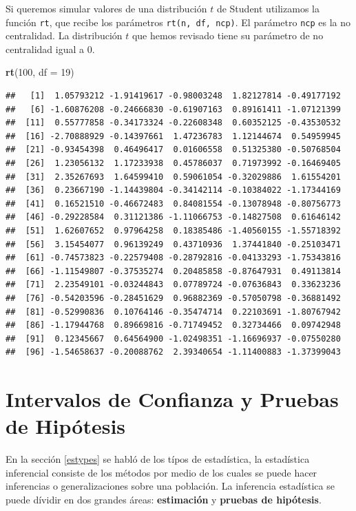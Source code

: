 \documentclass[]{book}
\newenvironment{Shaded}{\begin{snugshade}}{\end{snugshade}}
\newcommand{\DataTypeTok}[1]{\textcolor[rgb]{0.13,0.29,0.53}{#1}}
\newcommand{\DecValTok}[1]{\textcolor[rgb]{0.00,0.00,0.81}{#1}}
\newcommand{\KeywordTok}[1]{\textcolor[rgb]{0.13,0.29,0.53}{\textbf{#1}}}
\newcommand{\NormalTok}[1]{#1}
\begin{document}
Si queremos simular valores de una distribución \(t\) de Student utilizamos la función \texttt{rt}, que recibe los parámetros \texttt{rt(n,\ df,\ ncp)}. El parámetro \texttt{ncp} es la no centralidad. La distribución \(t\) que hemos revisado tiene su parámetro de no centralidad igual a \(0\).

\begin{Shaded}
\begin{Highlighting}[]
\KeywordTok{rt}\NormalTok{(}\DecValTok{100}\NormalTok{, }\DataTypeTok{df =} \DecValTok{19}\NormalTok{)}
\end{Highlighting}
\end{Shaded}

\begin{verbatim}
##   [1]  1.05793212 -1.91419617 -0.98003248  1.82127814 -0.49177192
##   [6] -1.60876208 -0.24666830 -0.61907163  0.89161411 -1.07121399
##  [11]  0.55777858 -0.34173324 -0.22608348  0.60352125 -0.43530532
##  [16] -2.70888929 -0.14397661  1.47236783  1.12144674  0.54959945
##  [21] -0.93454398  0.46496417  0.01606558  0.51325380 -0.50768504
##  [26]  1.23056132  1.17233938  0.45786037  0.71973992 -0.16469405
##  [31]  2.35267693  1.64599410  0.59061054 -0.32029886  1.61554201
##  [36]  0.23667190 -1.14439804 -0.34142114 -0.10384022 -1.17344169
##  [41]  0.16521510 -0.46672483  0.84081554 -0.13078948 -0.80756773
##  [46] -0.29228584  0.31121386 -1.11066753 -0.14827508  0.61646142
##  [51]  1.62607652  0.97964258  0.18385486 -1.40560155 -1.55718392
##  [56]  3.15454077  0.96139249  0.43710936  1.37441840 -0.25103471
##  [61] -0.74573823 -0.22579408 -0.28792816 -0.04133293 -1.75343816
##  [66] -1.11549807 -0.37535274  0.20485858 -0.87647931  0.49113814
##  [71]  2.23549101 -0.03244843  0.07789724 -0.07636843  0.33623236
##  [76] -0.54203596 -0.28451629  0.96882369 -0.57050798 -0.36881492
##  [81] -0.52990836  0.10764146 -0.35474714  0.22103691 -1.80767942
##  [86] -1.17944768  0.89669816 -0.71749452  0.32734466  0.09742948
##  [91]  0.12345667  0.64564900 -1.02498351 -1.16696937 -0.07550280
##  [96] -1.54658637 -0.20088762  2.39340654 -1.11400883 -1.37399043
\end{verbatim}

\hypertarget{icph}{%
\chapter{Intervalos de Confianza y Pruebas de Hipótesis}\label{icph}}

En la sección \ref{estypes} se habló de los típos de estadística, la estadística inferencial consiste de los métodos por medio de los cuales se puede hacer inferencias o generalizaciones sobre una población. La inferencia estadística se puede dívidir en dos grandes áreas: \textbf{estimación} y \textbf{pruebas de hipótesis}.
\end{document}
